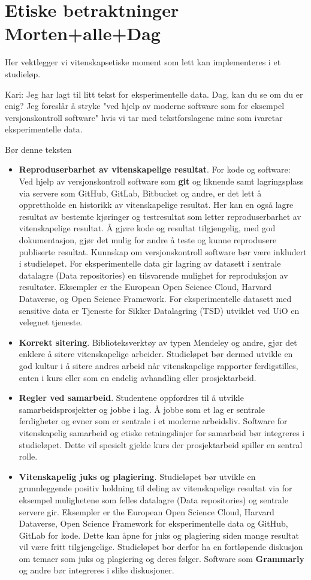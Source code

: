 \documentclass{article}
\begin{document}
\section{Etiske betraktninger {\color{red} Morten+alle+Dag}}
Her vektlegger vi vitenskapsetiske moment som lett kan implementeres i et studieløp.

{\color{red} Kari: Jeg har lagt til litt tekst for eksperimentelle data. Dag, kan du se om du er enig? Jeg foreslår å stryke "ved hjelp av moderne software som for eksempel versjonskontroll software" hvis vi tar med tekstforslagene mine som ivaretar eksperimentelle data.

Bør denne teksten }
\begin{itemize}
  \item {\bf Reproduserbarhet av vitenskapelige resultat}. For kode og software: Ved hjelp av versjonskontroll software som {\bf git} og liknende samt lagringsplass via servere som GitHub, GitLab, Bitbucket og andre, er det lett å opprettholde en historikk av vitenskapelige resultat. Her kan en også lagre resultat av bestemte kjøringer og testresultat som letter reproduserbarhet av vitenskapelige resultat. Å gjøre kode og resultat tilgjengelig, med god dokumentasjon, gjør det mulig for andre å teste og kunne reprodusere publiserte resultat. Kunnskap om versjonskontroll software bør være inkludert i studieløpet. For eksperimentelle data gir lagring av datasett i sentrale datalagre (Data repositories) en tilsvarende mulighet for reproduksjon av resultater. Eksempler er the European Open Science Cloud, Harvard Dataverse, og Open Science Framework. For eksperimentelle datasett med sensitive data er Tjeneste for Sikker Datalagring (TSD) utviklet ved UiO en velegnet tjeneste. 
  \item {\bf Korrekt sitering}. Biblioteksverktøy  av typen Mendeley og andre, gjør det enklere å sitere vitenskapelige arbeider. Studieløpet bør dermed utvikle en god kultur i å sitere andres arbeid når vitenskapelige rapporter ferdigstilles, enten i kurs eller som en endelig avhandling eller prosjektarbeid.
  \item {\bf Regler ved samarbeid}. Studentene oppfordres til å utvikle samarbeidsprosjekter og jobbe i lag. Å jobbe som et lag er sentrale ferdigheter og evner som er sentrale i et moderne arbeidsliv. Software for vitenskapelig samarbeid og etiske retningslinjer for samarbeid bør integreres i studieløpet. Dette vil spesielt gjelde kurs der prosjektarbeid spiller en sentral rolle.
  \item {\bf Vitenskapelig juks og plagiering}. Studieløpet bør utvikle en grunnleggende positiv holdning til deling av vitenskapelige resultat via for eksempel mulighetene som felles datalagre (Data repositories) og sentrale servere gir. Eksempler er the European Open Science Cloud, Harvard Dataverse, Open Science Framework for eksperimentelle data og GitHub, GitLab for kode. Dette kan åpne for juks og plagiering siden mange resultat vil være fritt tilgjengelige. Studieløpet bor derfor ha en fortløpende diskusjon om temaer som juks og plagiering og deres følger. Software som {\bf Grammarly} og andre bør integreres i slike diskusjoner. 

\end{itemize}
\end{document}
